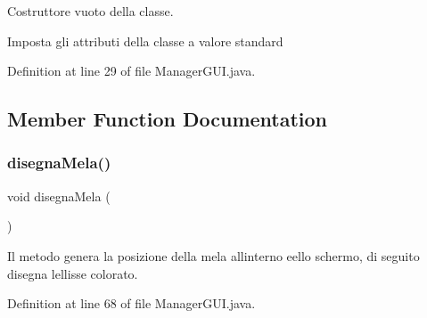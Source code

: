 Costruttore vuoto della classe. 

Imposta gli attributi della classe a valore standard 

Definition at line 29 of file Manager\+G\+U\+I.\+java.



\subsection{Member Function Documentation}
\mbox{\label{class_snake_1_1gui_1_1_manager_g_u_i_a438db0a39d5c05d1dc557b2927726ef7}} 
\subsubsection{\texorpdfstring{disegna\+Mela()}{disegnaMela()}}
{\footnotesize\ttfamily void disegna\+Mela (\begin{DoxyParamCaption}{ }\end{DoxyParamCaption})\hspace{0.3cm}{\ttfamily [private]}}



Il metodo genera la posizione della mela all\textquotesingle{}interno eello schermo, di seguito disegna l\textquotesingle{}ellisse colorato. 



Definition at line 68 of file Manager\+G\+U\+I.\+java.

